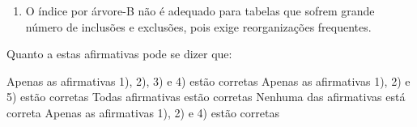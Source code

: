 \documentclass[12pt, addpoints]{exam}
\begin{document}
\begin{questions}
\begin{enumerate}
    \item O índice por árvore-B não é adequado para tabelas que sofrem grande número de inclusões e exclusões, pois exige reorganizações frequentes.

\end{enumerate}





Quanto a estas afirmativas pode se dizer que:
\begin{choices}
\choice Apenas as afirmativas 1), 2), 3) e 4) estão corretas
\choice Apenas as afirmativas 1), 2) e 5) estão corretas
\choice Todas afirmativas estão corretas
\choice Nenhuma das afirmativas está correta
\choice Apenas as afirmativas 1), 2) e 4) estão corretas
\end{choices}



    \end{questions}
    
\end{document}
